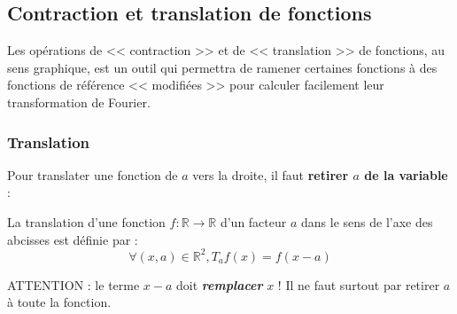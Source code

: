 \documentclass[12pt, a4paper]{article}
\begin{document}
\begin{center}
\end{center}

\subsection{Contraction et translation de fonctions}

Les opérations de << contraction >> et de << translation >> de fonctions, au sens graphique, est un outil qui permettra de ramener certaines fonctions à des fonctions de référence << modifiées >> pour calculer facilement leur transformation de Fourier.

\subsubsection{Translation}

Pour translater une fonction de $a$ vers la droite, il faut \textbf{retirer $a$ de la variable} :

\begin{tcolorbox}
	La translation d'une fonction $f:\mathbb{R} \to \mathbb{R}$ d'un facteur $a$ dans le sens de l'axe des abcisses est définie par :
	\begin{equation*}
		\forall (x, a) \in \mathbb{R}^2, T_{a}f(x) = f(x - a)
	\end{equation*}
	
	ATTENTION : le terme $x - a$ doit \textbf{\emph{remplacer}} $x$ ! Il ne faut surtout par retirer $a$ à toute la fonction.
\end{tcolorbox}

\begin{center}
\end{center}
\end{document}
